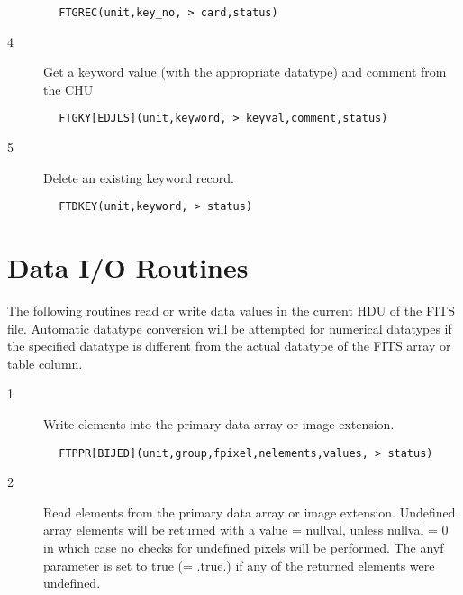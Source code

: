 \documentclass[11pt]{book}
\begin{document}
\begin{verbatim}
        FTGREC(unit,key_no, > card,status)
\end{verbatim}

\begin{description}
\item[4 ] Get a keyword value (with the appropriate datatype) and comment from
   the CHU
\end{description}

\begin{verbatim}
        FTGKY[EDJLS](unit,keyword, > keyval,comment,status)
\end{verbatim}

\begin{description}
\item[5 ] Delete an existing keyword record.
\end{description}

\begin{verbatim}
        FTDKEY(unit,keyword, > status)
\end{verbatim}


\section{Data I/O Routines}

The following routines read or write data values in the current HDU of
the FITS file.  Automatic datatype conversion
will be attempted for numerical datatypes if the specified datatype is
different from the actual datatype of the FITS array or table column.


\begin{description}
\item[1 ]Write elements into the primary data array or image extension.
\end{description}

\begin{verbatim}
        FTPPR[BIJED](unit,group,fpixel,nelements,values, > status)
\end{verbatim}

\begin{description}
\item[2 ] Read elements from the primary data array or image extension.
    Undefined array elements will be
    returned with a value = nullval, unless nullval = 0 in which case no
    checks for undefined pixels will be performed. The anyf parameter is
    set to true (= .true.) if any of the returned
   elements were undefined.
\end{description}
\end{document}
